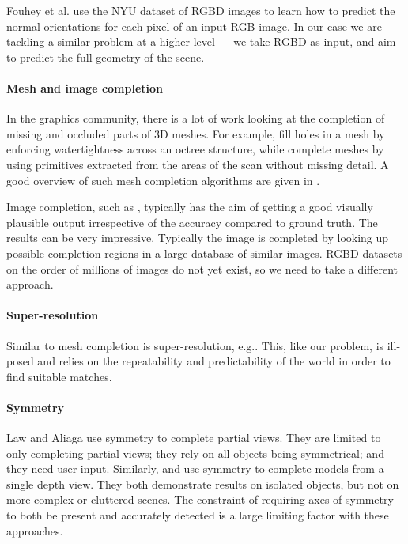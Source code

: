 \documentclass[10pt,a4paper, twocolumn]{article}
\makeatletter
\newcommand*{\eg}{e.g.\@\xspace}
\newcommand*{\ea}{et al.\@\xspace}
\makeatother
\begin{document}
Fouhey \ea \cite{fouhey-iccv-2013} use the NYU dataset of RGBD images to learn how to predict the normal orientations for each pixel of an input RGB image. 
In our case we are tackling a similar problem at a higher level --- we take RGBD as input, and aim to predict the full geometry of the scene.

\paragraph{Mesh and image completion}
In the graphics community, there is a lot of work looking at the completion of missing and occluded parts of 3D meshes. 
For example, \cite{podolak-esgp-2005} fill holes in a mesh by enforcing watertightness across an octree structure, while \cite{schnabel-eurographics-2009} complete meshes by using primitives extracted from the areas of the scan without missing detail. 
A good overview of such mesh completion algorithms are given in \cite{ju-cst-2009}.

Image completion, such as \cite{hays-siggraph-2007}, typically has the aim of getting a good visually plausible output irrespective of the accuracy compared to ground truth. 
The results can be very impressive. 
Typically the image is completed by looking up possible completion regions in a large database of similar images.
RGBD datasets on the order of millions of images do not yet exist, so we need to take a different approach.


\paragraph{Super-resolution}
Similar to mesh completion is super-resolution, \eg \cite{macaodha-eccv-2012}. 
This, like our problem, is ill-posed and relies on the repeatability and predictability of the world in order to find suitable matches.


\paragraph{Symmetry}
Law and Aliaga \cite{law-cviu-2010} use symmetry to complete partial views. 
They are limited to only completing partial views; they rely on all objects being symmetrical; and they need user input.
Similarly, \cite{thrun-iccv-2005} and \cite{kroemer-humanoids-2012} use symmetry to complete models from a single depth view. 
They both demonstrate results on isolated objects, but not on more complex or cluttered scenes. 
The constraint of requiring axes of symmetry to both be present and accurately detected is a large limiting factor with these approaches.
\end{document}
